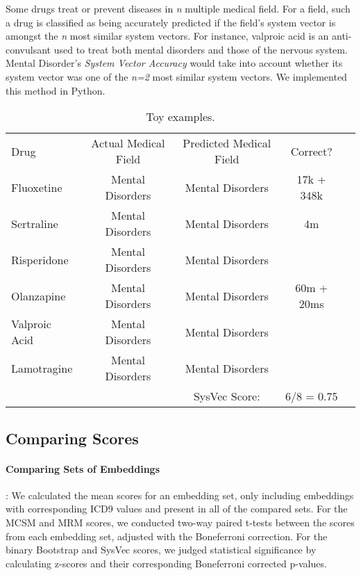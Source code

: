 \documentclass[11pt,a4paper]{article}
\begin{document}
Some drugs treat or prevent diseases in \emph{n} multiple medical field. For a field, such a drug is classified as being accurately predicted if the field's system vector is amongst the \emph{n} most similar system vectors. For instance, valproic acid is an anti-convulsant used to treat both mental disorders and those of the nervous system. Mental Disorder's \emph{System Vector Accuracy} would take into account whether its system vector was one of the \emph{n=2} most similar system vectors.  We implemented this method in Python. 

\begin{table*}[h!]
	
	\begin{center}
		\begin{tabular}{lcccl} %
			Drug & Actual Medical Field & Predicted Medical Field & Correct?\\
			\hlineB{4}
			Fluoxetine & Mental Disorders & Mental Disorders & 17k + 348k \\
			Sertraline & Mental Disorders & Mental Disorders& 4m \\
			Risperidone & Mental Disorders & Mental Disorders & \\
			Olanzapine & Mental Disorders & Mental Disorders & 60m + 20ms\\
			Valproic Acid & Mental Disorders & Mental Disorders & \\
			Lamotragine & Mental Disorders & Mental Disorders & \\
			\hline
			 &  & SysVec Score:& 6/8 = 0.75
		\end{tabular}
	\end{center}
	\caption{Toy examples.}
	\label{tab:sysvectoy}
\end{table*}

\subsection{Comparing Scores}

\paragraph{Comparing Sets of Embeddings}: We calculated the mean scores for an embedding set, only including embeddings with corresponding ICD9 values and present in all of the compared sets. For the MCSM and MRM scores, we conducted two-way paired t-tests between the scores from each embedding set, adjusted with the Boneferroni correction. For the binary Bootstrap and SysVec scores, we judged statistical significance by calculating z-scores and their corresponding Boneferroni corrected p-values. 
\end{document}
